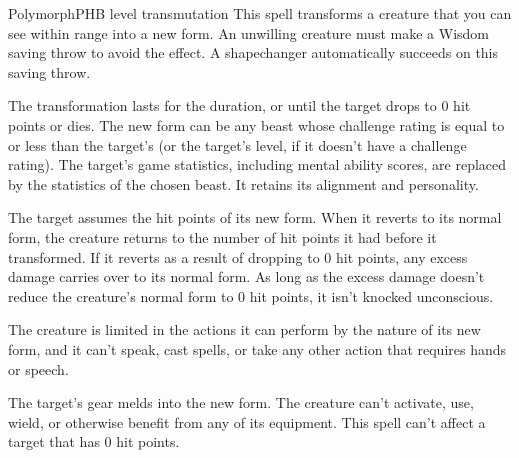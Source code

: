 \begin{spell}{Polymorph}{PHB}{ level transmutation}
{
}
This spell transforms a creature that you can see within range into a new form.
An unwilling creature must make a Wisdom saving throw to avoid the effect. A
shapechanger automatically succeeds on this saving throw.

The transformation lasts for the duration, or until the target drops to 0 hit
points or dies. The new form can be any beast whose challenge rating is equal
to or less than the target’s (or the target’s level, if it doesn’t have a
challenge rating). The target’s game statistics, including mental ability 
scores, are replaced by the statistics of the chosen beast. It retains its
alignment and personality.

The target assumes the hit points of its new form. When it reverts to its
normal form, the creature returns to the number of hit points it had before it
transformed. If it reverts as a result of dropping to 0 hit points, any excess
damage carries over to its normal form. As long as the excess damage doesn’t
reduce the creature’s normal form to 0 hit points, it isn’t knocked unconscious.

The creature is limited in the actions it can perform by the nature of its new
form, and it can’t speak, cast spells, or take any other action that requires 
hands or speech.

The target’s gear melds into the new form. The creature can’t activate, use,
wield, or otherwise benefit from any of its equipment. This spell can’t affect
a target that has 0 hit points.
\end{spell}
